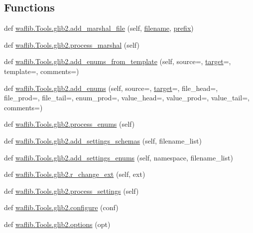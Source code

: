 \subsection*{Functions}
\begin{DoxyCompactItemize}
\item 
def \hyperlink{namespacewaflib_1_1_tools_1_1glib2_acf0a8c8e25827dc3701010d5bfcd7671}{waflib.\+Tools.\+glib2.\+add\+\_\+marshal\+\_\+file} (self, \hyperlink{test__portburn_8cpp_a7efa5e9c7494c7d4586359300221aa5d}{filename}, \hyperlink{structprefix}{prefix})
\item 
def \hyperlink{namespacewaflib_1_1_tools_1_1glib2_a456283be5d64f885ee242262515ab720}{waflib.\+Tools.\+glib2.\+process\+\_\+marshal} (self)
\item 
def \hyperlink{namespacewaflib_1_1_tools_1_1glib2_ab6cc5b3a61941917b2ef0b0ee747d093}{waflib.\+Tools.\+glib2.\+add\+\_\+enums\+\_\+from\+\_\+template} (self, source=\textquotesingle{}\textquotesingle{}, \hyperlink{lib_2expat_8h_a15a257516a87decb971420e718853137}{target}=\textquotesingle{}\textquotesingle{}, template=\textquotesingle{}\textquotesingle{}, comments=\textquotesingle{}\textquotesingle{})
\item 
def \hyperlink{namespacewaflib_1_1_tools_1_1glib2_a311bc9d55cb4c2ec013725e387841175}{waflib.\+Tools.\+glib2.\+add\+\_\+enums} (self, source=\textquotesingle{}\textquotesingle{}, \hyperlink{lib_2expat_8h_a15a257516a87decb971420e718853137}{target}=\textquotesingle{}\textquotesingle{}, file\+\_\+head=\textquotesingle{}\textquotesingle{}, file\+\_\+prod=\textquotesingle{}\textquotesingle{}, file\+\_\+tail=\textquotesingle{}\textquotesingle{}, enum\+\_\+prod=\textquotesingle{}\textquotesingle{}, value\+\_\+head=\textquotesingle{}\textquotesingle{}, value\+\_\+prod=\textquotesingle{}\textquotesingle{}, value\+\_\+tail=\textquotesingle{}\textquotesingle{}, comments=\textquotesingle{}\textquotesingle{})
\item 
def \hyperlink{namespacewaflib_1_1_tools_1_1glib2_aca6df9f0a0afde09bfbc5d3e98702075}{waflib.\+Tools.\+glib2.\+process\+\_\+enums} (self)
\item 
def \hyperlink{namespacewaflib_1_1_tools_1_1glib2_ab531686066a4e372e11153f59eb8a628}{waflib.\+Tools.\+glib2.\+add\+\_\+settings\+\_\+schemas} (self, filename\+\_\+list)
\item 
def \hyperlink{namespacewaflib_1_1_tools_1_1glib2_ae4d2a8204307e1016e1da9f22c082bf5}{waflib.\+Tools.\+glib2.\+add\+\_\+settings\+\_\+enums} (self, namespace, filename\+\_\+list)
\item 
def \hyperlink{namespacewaflib_1_1_tools_1_1glib2_a4d5b1ae5edd56cff1b39d4979510bf7b}{waflib.\+Tools.\+glib2.\+r\+\_\+change\+\_\+ext} (self, ext)
\item 
def \hyperlink{namespacewaflib_1_1_tools_1_1glib2_af1dcb72130b8fd03b0227b60d647e0e8}{waflib.\+Tools.\+glib2.\+process\+\_\+settings} (self)
\item 
def \hyperlink{namespacewaflib_1_1_tools_1_1glib2_a0bfcb0b9cc3811f9e8db925651d664fb}{waflib.\+Tools.\+glib2.\+configure} (conf)
\item 
def \hyperlink{namespacewaflib_1_1_tools_1_1glib2_a73e118c0f183f41207cd7b59729a6d9d}{waflib.\+Tools.\+glib2.\+options} (opt)
\end{DoxyCompactItemize}
